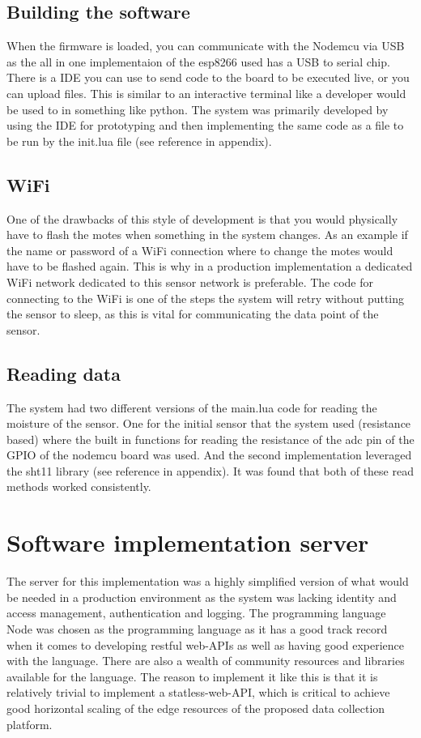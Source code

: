 \documentclass[]{uiophd}
\begin{document}
\subsection{Building the software}
When the firmware is loaded, you can communicate with the Nodemcu via USB as the all in one implementaion of the esp8266 used has a USB to serial chip. There is a IDE you can use to send code to the board to be executed live, or you can upload files. This is similar to an interactive terminal like a developer would be used to in something like python. The system was primarily developed by using the IDE for prototyping and then implementing the same code as a file to be run by the init.lua file (see reference in appendix).
\subsection{WiFi}
One of the drawbacks of this style of development is that you would physically have to flash the motes when something in the system changes. As an example if the name or password of a WiFi connection where to change the motes would have to be flashed again. This is why in a production implementation a dedicated WiFi network dedicated to this sensor network is preferable. The code for connecting to the WiFi is one of the steps the system will retry without putting the sensor to sleep, as this is vital for communicating the data point of the sensor.
\subsection{Reading data}
The system had two different versions of the main.lua code for reading the moisture of the sensor. One for the initial sensor that the system used (resistance based) where the built in functions for reading the resistance of the adc pin of the GPIO of the nodemcu board was used. And the second implementation leveraged the sht11 library (see reference in appendix). It was found that both of these read methods worked consistently.
\section{Software implementation server}
The server for this implementation was a highly simplified version of what would be needed in a production environment as the system was lacking identity and access management, authentication and logging. The programming language Node was chosen as the programming language as it has a good track record when it comes to developing restful web-APIs as well as having good experience with the language. There are also a wealth of community resources and libraries available for the language. The reason to implement it like this is that it is relatively trivial to implement a statless-web-API, which is critical to achieve good horizontal scaling of the edge resources of the proposed data collection platform.
\end{document}
